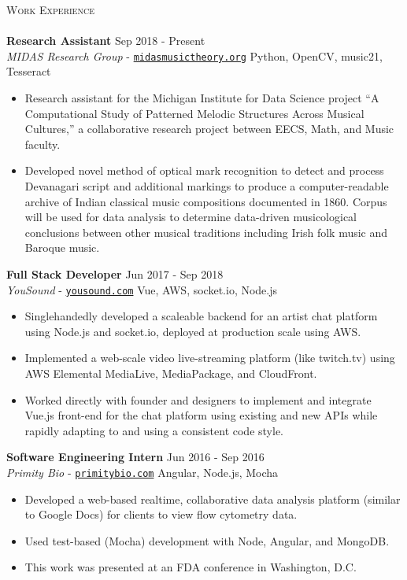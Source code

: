 \documentclass[11pt]{extarticle}
\newcommand{\lineunder} {
	\vspace*{-8pt} \\
	\hspace*{-18pt} \hrulefill \\
}
\newcommand{\header} [1] {
	{\hspace*{-18pt}\vspace*{6pt} \textsc{#1}}
	\vspace*{-6pt} \lineunder
}
\begin{document}
\noindent
\header{Work Experience}
\noindent
\textbf{Research Assistant} \hfill Sep 2018 - Present\\
\textit{MIDAS Research Group} - \href{https://midasmusictheory.org}{\texttt{midasmusictheory.org}} \hfill Python, OpenCV, music21, Tesseract\\
\vspace{-6mm}
\begin{itemize} \itemsep 0.1pt
	\item Research assistant for the Michigan Institute for Data Science project “A Computational Study of Patterned Melodic Structures Across Musical Cultures,” a collaborative research project between EECS, Math, and Music faculty.
	\item Developed novel method of optical mark recognition to detect and process Devanagari script and additional markings to produce a computer-readable archive of Indian classical music compositions documented in 1860. Corpus will be used for data analysis to determine data-driven musicological conclusions between other musical traditions including Irish folk music and Baroque music. 
\end{itemize}

\noindent
\textbf{Full Stack Developer} \hfill Jun 2017 - Sep 2018\\
\textit{YouSound} - \href{https://yousound.com/}{\texttt{yousound.com}} \hfill Vue, AWS, socket.io, Node.js \\
\vspace{-6mm}
\begin{itemize} \itemsep 0.1pt
	\item Singlehandedly developed a scaleable backend for an artist chat platform using Node.js and socket.io, deployed at production scale using AWS.
	\item Implemented a web-scale video live-streaming platform (like twitch.tv) using AWS Elemental MediaLive, MediaPackage, and CloudFront.
    \item Worked directly with founder and designers to implement and integrate Vue.js front-end for the chat platform using existing and new APIs while rapidly adapting to and using a consistent code style.
\end{itemize}

\noindent
\textbf{Software Engineering Intern} \hfill Jun 2016 - Sep 2016\\
\textit{Primity Bio} - \href{https://primitybio.com}{\texttt{primitybio.com}} \hfill Angular, Node.js, Mocha \\
\vspace{-6mm}
\begin{itemize} \itemsep 0.1pt
	\item Developed a web-based realtime, collaborative data analysis platform (similar to Google Docs) for clients to view flow cytometry data.
	\item Used test-based (Mocha) development with Node, Angular, and MongoDB.
	\item This work was presented at an FDA conference in Washington, D.C.
\end{itemize}
\end{document}
